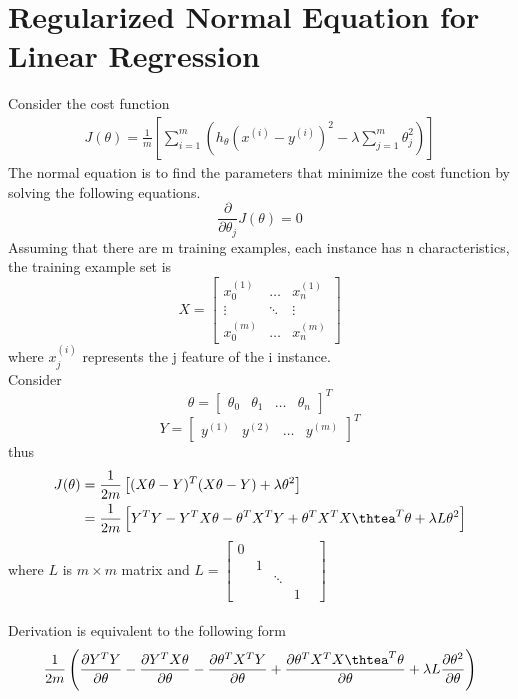 \documentclass[UTF8]{article}
\begin{document}
\section{Regularized Normal Equation for Linear Regression}
\noindent Consider the cost function
\begin{align*}
  J(\theta)=\frac{1}{m} \left[
  \sum_{i=1}^m(h_\theta(x^{(i)}-y^{(i)})^2 - \lambda\sum_{j=1}^m\theta_j^2)
  \right]
\end{align*}
The normal equation is to find the parameters that minimize the cost function by solving the following equations.
\begin{equation*}
  \frac{\partial}{\partial\theta_j}J(\theta) = 0
\end{equation*}
Assuming that there are m training examples, each instance has n characteristics, the training example set is
\begin{equation*}
  X = \left[
  \begin{matrix}
      x_0^{(1)} & \dots &x_n^{(1)} \\
      \vdots & \ddots & \vdots \\
      x_0^{(m)} & \dots & x_n^{(m)}
  \end{matrix}
\right]
\end{equation*}
where $x_j^{(i)}$ represents the j feature of the i instance.\\
Consider
\begin{equation*}
  \theta = \left[
  \begin{matrix}
    \theta_0 & \theta_1 & \dots & \theta_n
  \end{matrix}
  \right]^T
\end{equation*}
\begin{equation*}
  Y = \left[
  \begin{matrix}
  y^{(1)} & y^{(2)} & \dots & y^{(m)}
  \end{matrix}
  \right]^T
\end{equation*}
thus
\begin{align*}
  J(\theta) &= \frac{1}{2m} \left[
   (X\theta - Y)^T(X\theta - Y) + \lambda\theta^2
  \right] \\
  &= \frac{1}{2m} \left[
   Y^TY - Y^TX\theta - \theta^TX^TY + \theta^TX^TX\thtea^T\theta + \lambda L\theta^2
  \right]
\end{align*}
where $L$ is $m \times m$ matrix and
$
  L = \left[
  \begin{matrix}
    0 &   &  & \\
      & 1 &  & \\
      &   & \ddots & \\
      &   &  & 1 &
  \end{matrix}
  \right]
$ \\ \\
Derivation is equivalent to the following form
\begin{equation*}
  \frac{1}{2m}\left(
  \frac{\partial Y^TY}{\partial \theta} - \frac{\partial Y^TX\theta}{\partial\theta} - \frac{\partial\theta^TX^TY}{\partial \theta} + \frac{\partial\theta^TX^TX\thtea^T\theta}{\partial\theta} + \lambda L\frac{\partial\theta^2}{\partial\theta}\right)
\end{equation*}
\end{document}
